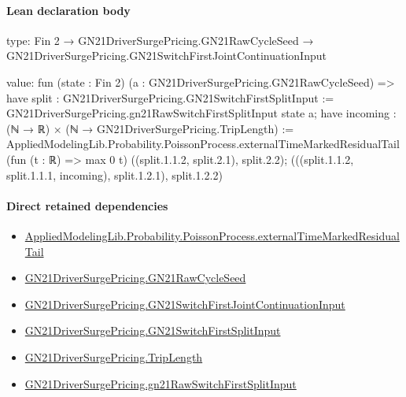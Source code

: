 \documentclass[10pt]{article}
\begin{document}
\paragraph{Lean declaration body}
\begin{ReviewVerbatim}
type:
Fin 2 → GN21DriverSurgePricing.GN21RawCycleSeed → GN21DriverSurgePricing.GN21SwitchFirstJointContinuationInput

value:
fun (state : Fin 2) (a : GN21DriverSurgePricing.GN21RawCycleSeed) =>
  have split : GN21DriverSurgePricing.GN21SwitchFirstSplitInput :=
    GN21DriverSurgePricing.gn21RawSwitchFirstSplitInput state a;
  have incoming : (ℕ → ℝ) × (ℕ → GN21DriverSurgePricing.TripLength) :=
    AppliedModelingLib.Probability.PoissonProcess.externalTimeMarkedResidualTail (fun (t : ℝ) => max 0 t)
      ((split.1.1.2, split.2.1), split.2.2);
  (((split.1.1.2, split.1.1.1, incoming), split.1.2.1), split.1.2.2)
\end{ReviewVerbatim}

\paragraph{Direct retained dependencies}
\begin{itemize}\raggedright
\item \hyperlink{governing-declaration-4cfc6e32ef9aa9b5}{Applied\allowbreak{}Modeling\allowbreak{}Lib.\allowbreak{}Probability.\allowbreak{}Poisson\allowbreak{}Process.\allowbreak{}external\allowbreak{}Time\allowbreak{}Marked\allowbreak{}Residual\allowbreak{}Tail}
\item \hyperlink{governing-declaration-228de34d5811f602}{GN21\allowbreak{}Driver\allowbreak{}Surge\allowbreak{}Pricing.\allowbreak{}GN21\allowbreak{}Raw\allowbreak{}Cycle\allowbreak{}Seed}
\item \hyperlink{governing-declaration-86c2f359d1b10720}{GN21\allowbreak{}Driver\allowbreak{}Surge\allowbreak{}Pricing.\allowbreak{}GN21\allowbreak{}Switch\allowbreak{}First\allowbreak{}Joint\allowbreak{}Continuation\allowbreak{}Input}
\item \hyperlink{governing-declaration-dc2aa59edd414705}{GN21\allowbreak{}Driver\allowbreak{}Surge\allowbreak{}Pricing.\allowbreak{}GN21\allowbreak{}Switch\allowbreak{}First\allowbreak{}Split\allowbreak{}Input}
\item \hyperlink{governing-declaration-a616c143f22cf2bc}{GN21\allowbreak{}Driver\allowbreak{}Surge\allowbreak{}Pricing.\allowbreak{}Trip\allowbreak{}Length}
\item \hyperlink{governing-declaration-c687ca35c226ab91}{GN21\allowbreak{}Driver\allowbreak{}Surge\allowbreak{}Pricing.\allowbreak{}gn21\allowbreak{}Raw\allowbreak{}Switch\allowbreak{}First\allowbreak{}Split\allowbreak{}Input}
\end{itemize}
\hypertarget{governing-declaration-0d476212eea1e0dd}{}
\end{document}
